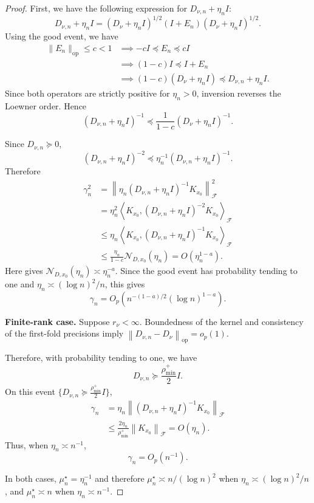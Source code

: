 \documentclass[11pt]{article}
\newcommand{\F}{\mathcal{F}}
\newcommand{\Ncal}{\mathcal{N}}
\newcommand{\op}{\mathrm{op}}
\newcommand{\inner}[2]{\left\langle #1,#2\right\rangle}
\newcommand{\norm}[1]{\left\lVert #1\right\rVert}
\newcommand{\preceqL}{\preceq}
\newcommand{\succeqL}{\succeq}
\begin{document}
\begin{proof}
First, we have the following expression for $D_{\nu,n} + \eta_n I$:
\[
D_{\nu,n}+\eta_nI
=(D_\nu+\eta_nI)^{1/2}(I+E_n)(D_\nu+\eta_nI)^{1/2}.
\]
Using the good event, we have
\begin{align*}
    \|E_n\|_{\op} \leq c < 1
    &\implies
    -cI \preceqL E_n \preceqL cI
    \\
    &\implies
    (1-c)I \preceqL I+E_n
    \\
    &\implies
    (1-c)(D_\nu+\eta_n I)
    \preceqL
    D_{\nu,n}+\eta_n I.
\end{align*}
Since both operators are strictly positive for $\eta_n>0$, inversion reverses the Loewner order. Hence
\[
    (D_{\nu,n}+\eta_n I)^{-1}
    \preceqL
    \frac{1}{1-c}(D_\nu+\eta_n I)^{-1}.
\]

\medskip
Since $D_{\nu,n}\succeq0$,
\[
  (D_{\nu,n}+\eta_n I)^{-2}
  \preceqL
  \eta_n^{-1}(D_{\nu,n}+\eta_n I)^{-1}.
\]
Therefore
\begin{align*}
  \gamma_n^2
  &= \norm{\eta_n (D_{\nu,n} + \eta_n I)^{-1} K_{x_0}}_{\F}^2\\
  &=\eta_n^2\inner{K_{x_0}}{(D_{\nu,n}+\eta_n I)^{-2} K_{x_0}}_{\F}\\
  &\le\eta_n\inner{K_{x_0}}{(D_{\nu,n}+\eta_nI)^{-1}K_{x_0}}_{\F}\\
  &\le\frac{\eta_n}{1-c}\Ncal_{D,x_0}(\eta_n)
  =O(\eta_n^{1-a}).
\end{align*}
Here  gives $\Ncal_{D,x_0}(\eta_n)\asymp\eta_n^{-a}$. Since the good event has probability tending to one and $\eta_n\asymp (\log n)^2/n$, this gives
\[
  \gamma_n=O_p\!\left(n^{-(1-a)/2}(\log n)^{1-a}\right).
\]

\medskip
\noindent\textbf{Finite-rank case.}
Suppose $r_\nu<\infty$. Boundedness of the kernel and consistency of the first-fold precisions imply $\norm{D_{\nu,n}-D_\nu}_{\op}=o_p(1)$.

Therefore, with probability tending to one, we have
\[
  D_{\nu,n}\succeqL\frac{\rho_{\min}^+}{2}I.
\]
On this event $\{ D_{\nu,n}\succeqL\frac{\rho_{\min}^+}{2}I\}$,
\begin{align*}
  \gamma_n
  &=
  \eta_n\norm{(D_{\nu,n}+\eta_n I)^{-1}K_{x_0}}_{\F}\\
  &\le
  \frac{2\eta_n}{\rho_{\min}^+}\norm{K_{x_0}}_{\F}
  =O(\eta_n).
\end{align*}
Thus, when $\eta_n\asymp n^{-1}$,
\[
  \gamma_n=O_p(n^{-1}).
\]

In both cases, $\mu_n^\star=\eta_n^{-1}$ and therefore $\mu_n^\star\asymp n/(\log n)^2$ when $\eta_n\asymp (\log n)^2/n$, and $\mu_n^\star\asymp n$ when $\eta_n\asymp n^{-1}$.

\end{proof}
\end{document}
